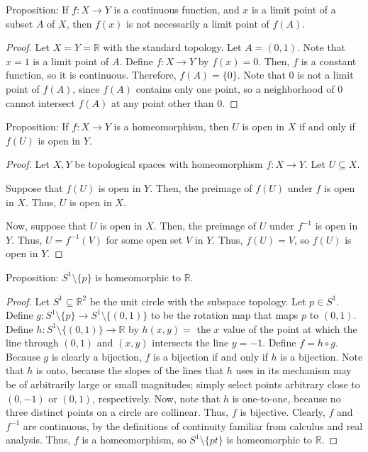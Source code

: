 \documentclass{article}
\newcommand{\inv}{^{-1}}
\newcommand{\R}{\mathbb R}
\begin{document}
\newpage{} Proposition: If $f: X \to Y$ is a continuous function, and $x$ is a limit point of a subset $A$ of $X$, then $f(x)$ is not necessarily a limit point of $f(A)$.
\begin{proof}
    Let $X = Y = \R$ with the standard topology.
    Let $A = (0,1)$.
    Note that $x=1$ is a limit point of $A$.
    Define $f: X \to Y$ by $f(x) = 0$.
    Then, $f$ is a constant function, so it is continuous.
    Therefore, $f(A) = \{0\}$.
    Note that $0$ is not a limit point of $f(A)$, since $f(A)$ contains only one point, so a neighborhood of 0 cannot intersect $f(A)$ at any point other than 0.
\end{proof}

\newpage{} Proposition: If $f: X \to Y$ is a homeomorphism, then $U$ is open in $X$ if and only if $f(U)$ is open in $Y$.
\begin{proof}
    Let $X, Y$ be topological spaces with homeomorphism $f: X \to Y$.
    Let $U \subseteq X$.
    
    Suppose that $f(U)$ is open in $Y$.
    Then, the preimage of $f(U)$ under $f$ is open in $X$.
    Thus, $U$ is open in $X$.

    Now, suppose that $U$ is open in $X$.
    Then, the preimage of $U$ under $f\inv$ is open in $Y$.
    Thus, $U = f\inv(V)$ for some open set $V$ in $Y$.
    Thus, $f(U) = V$, so $f(U)$ is open in $Y$.
\end{proof}

\newpage{} Proposition: $S^1 \setminus \{p\}$ is homeomorphic to $\R$.
\begin{proof}
    Let $S^1 \subseteq \R^2$ be the unit circle with the subspace topology.
    Let $p \in S^1$.
    Define $g: S^1 \setminus \{p\} \to S^1 \setminus \{(0,1)\}$ to be the rotation map that maps $p$ to $(0,1)$.
    Define $h: S^1 \setminus \{(0,1)\} \to \R$ by $h(x,y) = $ the $x$ value of the point at which the line through $(0,1)$ and $(x,y)$ intersects the line $y=-1$.
    Define $f = h \circ g$.
    Because $g$ is clearly a bijection, $f$ is a bijection if and only if $h$ is a bijection.
    Note that $h$ is onto, because the slopes of the lines that $h$ uses in its mechanism may be of arbitrarily large or small magnitudes; simply select points arbitrary close to $(0,-1)$ or $(0,1)$, respectively.
    Now, note that $h$ is one-to-one, because no three distinct points on a circle are collinear.
    Thus, $f$ is bijective.
    Clearly, $f$ and $f\inv$ are continuous, by the definitions of continuity familiar from calculus and real analysis.
    Thus, $f$ is a homeomorphism, so $S^1 \setminus \{pt\}$ is homeomorphic to $\R$.
\end{proof}
\end{document}
